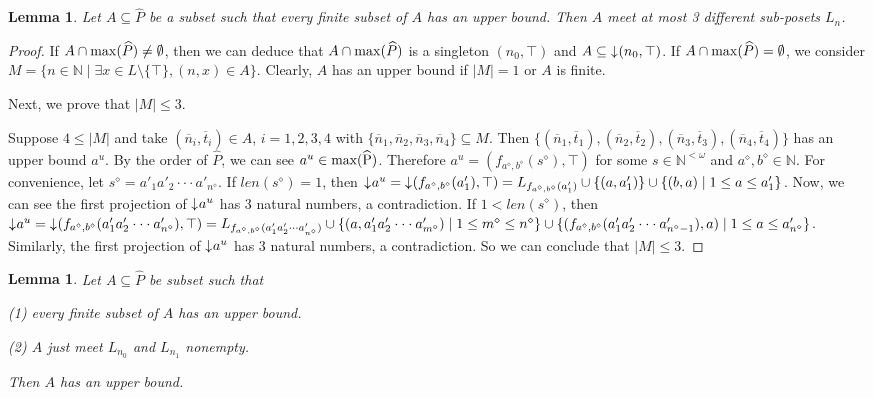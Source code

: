 \documentclass[preprint,12pt]{elsarticle}
\numberwithin{equation}{section}
\newtheorem{lemma}[theorem]{Lemma}
\newcommand{\dn}{\mathord{\downarrow}\hspace{0.05em}}
\begin{document}
\begin{lemma} Let $A\subseteq\widehat{P}$ be a subset such that every finite subset of $A$ has an upper bound. Then $A$ meet at most 3 different sub-posets $L_{n}$.
\end{lemma}
\begin{proof}If $A\cap {\rm max}(\widehat{P})\neq\emptyset$, then we can deduce that $A\cap {\rm max}(\widehat{P})$ is a singleton $(n_{0},\top)$ and $A\subseteq\dn (n_{0},\top)$. If $A\cap {\rm max}(\widehat{P})=\emptyset$, we consider $M=\{n\in\mathbb{N}\mid \exists x\in L\setminus\{\top\}, (n,x)\in A\}$. Clearly, $A$ has an upper bound if $|M|=1$ or $A$ is finite.

Next, we prove that $|M|\leq 3$.

Suppose $4\leq|M|$ and take $(\overline{n}_{i},\overline{t}_{i})\in A$, $i=1,2,3,4$ with $\{\overline{n}_{1},\overline{n}_{2},\overline{n}_{3},\overline{n}_{4}\}\subseteq M$. Then $\{(\overline{n}_{1},\overline{t}_{1}),(\overline{n}_{2},\overline{t}_{2}),(\overline{n}_{3},\overline{t}_{3}),(\overline{n}_{4},\overline{t}_{4})\}$
has an upper bound $a^{u}$. By the order of $\widehat{P}$, we can see $a^{u}\in {\rm max(\widehat{P})}$. Therefore $a^{u}=(f_{a^{\diamond},b^{\diamond}}(s^{\diamond}),\top)$ for some $s\in\mathbb{N}^{<\omega}$ and $a^{\diamond},b^{\diamond}\in\mathbb{N}$. For convenience, let $s^{\diamond}=a'_{1}a'_{2}\cdot\cdot\cdot a'_{n^{\diamond}}$. If $len(s^{\diamond})=1$, then
$\dn a^{u}=\dn(f_{a^{\diamond},b^{\diamond}}(a'_{1}),\top)=L_{f_{a^{\diamond},b^{\diamond}}(a'_{1})}\cup\{(a,a'_{1})\}\cup\{(b,a)\mid 1\leq a\leq a'_{1}\}$. Now, we can see the first projection of $\dn a^{u}$ has 3 natural numbers, a contradiction. If $1<len(s^{\diamond})$, then $\dn a^{u}=\dn(f_{a^{\diamond},b^{\diamond}}(a'_{1}a'_{2}\cdot\cdot\cdot a'_{n^{\diamond}}),\top)=L_{f_{a^{\diamond},b^{\diamond}}(a'_{1}a'_{2}\cdot\cdot\cdot a'_{n^{\diamond}})}\cup\{(a,a'_{1}a'_{2}\cdot\cdot\cdot a'_{m^{\diamond}})\mid 1\leq m^{\diamond}\leq n^{\diamond}\}\cup\{(f_{a^{\diamond},b^{\diamond}}(a'_{1}a'_{2}\cdot\cdot\cdot a'_{n^{\diamond}-1}),a)\mid 1\leq a\leq a'_{n^{\diamond}}\}$. Similarly, the first projection of $\dn a^{u}$ has 3 natural numbers, a contradiction. So we can conclude that $|M|\leq3$.\end{proof}

\begin{lemma} {\rm Let $A\subseteq\widehat{P}$ be subset such that

(1) every finite subset of $A$ has an upper bound.

(2) $A$ just meet $L_{n_{0}}$ and  $L_{n_{1}}$ nonempty.

Then $A$ has an upper bound.}

\end{lemma}
\end{document}
